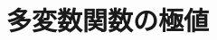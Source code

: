 \documentclass[../../topic_calculus]{subfiles}
\begin{document}
\chapter{多変数関数の極値}


\end{document}
